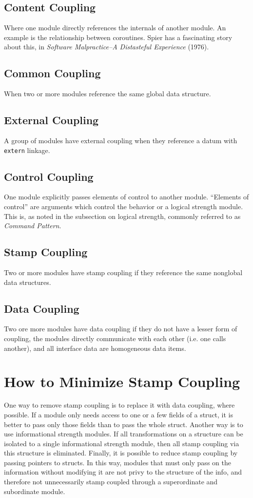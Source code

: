 \documentclass[format.tex]{subfiles}
\begin{document}
\subsection{Content Coupling}
Where one module directly references the internals of another module. An
example is the relationship between coroutines. Spier has a fascinating
story about this, in {\it Software Malpractice--A Distasteful Experience}
(1976).

\subsection{Common Coupling}
When two or more modules reference the same global data structure.

\subsection{External Coupling}
A group of modules have external coupling when they reference a datum with
\texttt{extern} linkage.

\subsection{Control Coupling}
One module explicitly passes elements of control to another module. ``Elements
of control'' are arguments which control the behavior or a logical strength
module. This is, as noted in the subsection on logical strength, commonly
referred to as {\it Command Pattern}.

\subsection{Stamp Coupling}
Two or more modules have stamp coupling if they reference the same nonglobal
data structures.

\subsection{Data Coupling}
Two ore more modules have data coupling if they do not have a lesser form of
coupling, the modules directly communicate with each other (i.e. one calls
another), and all interface data are homogeneous data items.

\section{How to Minimize Stamp Coupling}
One way to remove stamp coupling is to replace it with data coupling, where
possible. If a module only needs access to one or a few fields of a struct,
it is better to pass only those fields than to pass the whole struct. Another
way is to use informational strength modules. If all transformations on a
structure can be isolated to a single informational strength module, then all
stamp coupling via this structure is eliminated. Finally, it is possible to
reduce stamp coupling by passing pointers to structs. In this way, modules that
must only pass on the information without modifying it are not privy to the
structure of the info, and therefore not unnecessarily stamp coupled through a
superordinate and subordinate module.
\end{document}
